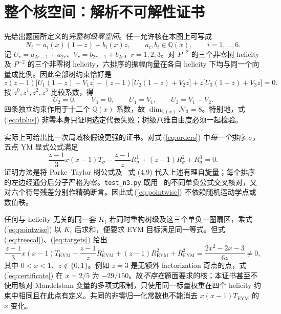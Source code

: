 \documentclass[UTF8,11pt,a4paper]{ctexart}
\newcommand{\EYM}{\mathrm{EYM}}
\begin{document}
\clearpage
\section{整个核空间：解析不可解性证书}

先给出题面所定义的\emph{完整树级零空间}。任一允许核在本图上可写成
\[
 N_i=a_i(x)(1-z)+b_i(x)z,\qquad a_i,b_i\in\mathbb Q(x),\qquad i=1,\ldots,6.
\]
记 $U_r=a_{2r-1}+a_{2r}$、$V_r=b_{2r-1}+b_{2r}$，$r=1,2,3$。对 $P^{+2}$ 的三个非零树 helicity 及 $P^{-2}$ 的三个非零树 helicity，六排序的振幅向量在各自 helicity 下均与同一个向量成比例。因此全部树约束恰好是
\begin{equation}
 z(z-1)\bigl[U_1(1-z)+V_1z\bigr]
 -(z-1)\bigl[U_2(1-z)+V_2z\bigr]
 +z\bigl[U_3(1-z)+V_3z\bigr]=0.
\label{eq:treepoly}
\end{equation}
按 $z^0,z^1,z^2,z^3$ 比较系数，得
\begin{equation}
 U_2=0,\qquad V_3=0,\qquad U_1=V_1,\qquad U_3=V_1-V_2.
\label{eq:nullspace}
\end{equation}
四条独立约束作用于十二个 $\mathbb Q(x)$ 系数，故 $\dim_{\mathbb Q(x)}\mathcal N_3=8$。特别地，式\,(\ref{eq:dplus}) 非零本身只证明选定代表失败；树级八维自由度必须一起检验。

实际上可给出比一次局域核假设更强的证书。对式\,(\ref{eq:orders}) 中\emph{每一个}排序 $\sigma$，五点 YM 显式公式满足
\begin{equation}
 \frac{z-1}{3}x(x-1)T_\sigma
 -\frac{z-1}{z}R^1_\sigma
 +(z-1)R^2_\sigma+R^3_\sigma=0.
\label{eq:pointwise}
\end{equation}
证明方法是将 Parke--Taylor 树公式及~\cite{ref:bdk05} 式 (4.9) 代入上述有理自旋量；每个排序的左边经通分后分子严格为零。\texttt{test\_n3.py} 既用~\cite{ref:bdk93} 的不同单负公式交叉核对，又对六个符号残差分别作精确断言。因此式\,(\ref{eq:pointwise}) 不依赖随机运动学点或数值秩。

任何与 helicity 无关的同一套 $K_i$ 若同时重构树级及这三个单负一圈扇区，乘式\,(\ref{eq:pointwise}) 以 $K_i$ 后求和，便要求 EYM 目标满足同一等式。但式\,(\ref{eq:treecal})、(\ref{eq:targets}) 给出
\begin{equation}
 \frac{z-1}{3}x(x-1)T_{\EYM}
 -\frac{z-1}{z}R^1_{\EYM}
 +(z-1)R^2_{\EYM}+R^3_{\EYM}
 =\frac{2x^2-2x-3}{6z}\ne0,
\label{eq:certificate}
\end{equation}
其中 $0<x<1$、$z\notin\{0,1\}$。例如 $z=3$ 是无额外 factorization 奇点的点，式\,(\ref{eq:certificate}) 在 $x=2/5$ 为 $-29/150$。故\emph{不存在}题面要求的核；本证书甚至不使用核对 Mandelstam 变量的多项式限制，只使用同一标量权重在四个 helicity 约束中相同且在此点有定义。共同的非零归一化常数也不能消去 $x(x-1)T_{\EYM}$ 的 $x$ 变化。
\end{document}
